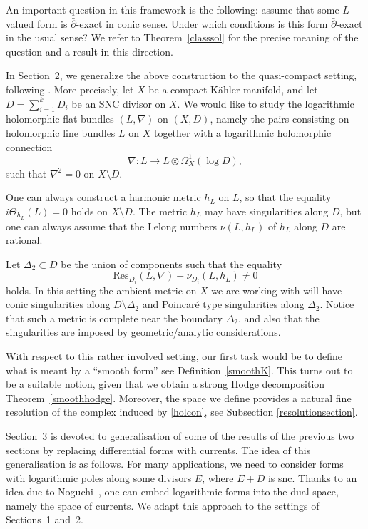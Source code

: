 \documentclass[english]{amsart}
\newcommand{\Res}{\mathrm{Res}}
\newcommand{\dbar}{\bar \partial}
\numberwithin{equation}{thm}
\begin{document}
	An important question in this framework is the following: assume that some \(L\)-valued form is \(\dbar\)-exact in conic sense. Under which conditions is this form \(\dbar\)-exact in the usual sense? We refer to Theorem~\ref{classsol} for the precise meaning of the question and a result in this direction.
	
	\medskip
	
	In Section~2, we generalize the above construction to the quasi-compact setting, following \cite{CDHP}. More precisely, let \(X\) be a compact K\"ahler manifold, and let \(D=\sum_{i=1}^k D_i\) be an SNC divisor on \(X\). We would like to study  the logarithmic holomorphic flat bundles \((L,\nabla)\) on $(X, D)$, namely the pairs consisting on holomorphic line bundles \(L\) on \(X\) together with a logarithmic holomorphic connection
	\begin{equation}\label{holcon}
		\nabla: L \to L\otimes \Omega_X^{1}(\log D),
	\end{equation}
	such that \(\nabla^2=0\) on \(X\setminus D\).
	
	One can always construct a harmonic metric \(h_L\) on \(L\), so that the equality \(i\Theta_{h_L}(L)=0\) holds on \(X\setminus D\). The metric \(h_L\) may have singularities along \(D\), but one can always assume that the Lelong numbers $\nu (L, h_L)$ of $h_L$ along \(D\) are rational.
	
	Let \(\Delta_2 \subset D\) be the union of components such that the equality
	$$\Res_{D_i}(L, \nabla) + \nu_{D_i} (L, h_L) \neq 0$$
holds.	 
In this setting the ambient metric on \(X\) we are working with will have conic singularities along \(D\setminus \Delta_2\) and Poincaré type singularities along \(\Delta_2\). Notice that
such a metric is complete near the boundary \(\Delta_2\), and also that the singularities are imposed by geometric/analytic considerations.
	
	With respect to this rather involved setting, our first task would be to define what is meant by a ``smooth form'' see Definition~\ref{smoothK}. This turns out to be a suitable notion, given that we obtain a strong Hodge decomposition Theorem~\ref{smoothhodge}. Moreover, the space we define provides a natural fine resolution of the complex induced by \eqref{holcon}, see Subsection \ref{resolutionsection}. 
	
	\medskip
	
	Section~3 is devoted to generalisation of some of the results of the previous two sections by replacing differential forms with currents. The idea of this generalisation is as follows.
	For many applications, we need to consider forms with logarithmic poles along some divisors \(E\), where \(E+D\) is snc. Thanks to an idea due to Noguchi~\cite{Nog95}, one can embed logarithmic forms into the dual space, namely the space of currents. We adapt this approach to the settings of Sections~1 and~2.
	
\end{document}
